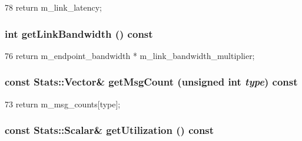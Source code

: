 \begin{DoxyCode}
78 { return m_link_latency; }
\end{DoxyCode}
\hypertarget{classThrottle_a654f468b758c044549d6d5ce77e462be}{
\subsubsection[{getLinkBandwidth}]{\setlength{\rightskip}{0pt plus 5cm}int getLinkBandwidth () const}}
\label{classThrottle_a654f468b758c044549d6d5ce77e462be}



\begin{DoxyCode}
76     { return m_endpoint_bandwidth * m_link_bandwidth_multiplier; }
\end{DoxyCode}
\hypertarget{classThrottle_a60cef761bf02d6ead7a88704ae0ba177}{
\subsubsection[{getMsgCount}]{\setlength{\rightskip}{0pt plus 5cm}const {\bf Stats::Vector}\& getMsgCount (unsigned int {\em type}) const}}
\label{classThrottle_a60cef761bf02d6ead7a88704ae0ba177}



\begin{DoxyCode}
73     { return m_msg_counts[type]; }
\end{DoxyCode}
\hypertarget{classThrottle_afca2b0b4c49a2c3a187f1d7782eee6cd}{
\subsubsection[{getUtilization}]{\setlength{\rightskip}{0pt plus 5cm}const {\bf Stats::Scalar}\& getUtilization () const}}
\label{classThrottle_afca2b0b4c49a2c3a187f1d7782eee6cd}



